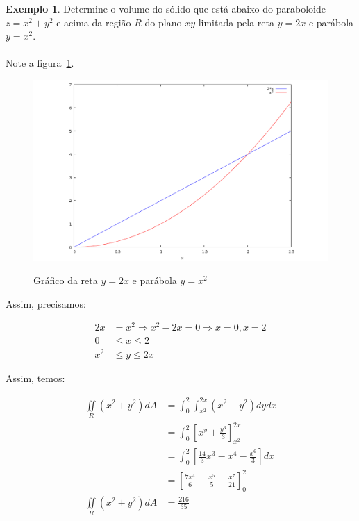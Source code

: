\documentclass{article}
\newcommand{\doubleint}[1] {\iint\limits_R #1 dA}
\theoremstyle{definition}
\newtheorem{example}{Exemplo}[section]
\begin{document}
        \begin{example}
            Determine o volume do sólido que está abaixo do paraboloide $z = x^2 + y^2$ e acima da região $R$ do plano $xy$ limitada pela reta
            $y = 2x$ e parábola $y = x^2$.

            \paragraph{}
            Note a figura~\ref{graph:reta-parabola}.
            
            \begin{figure}[h!]
                \includegraphics[width=\linewidth]{reta-parabola.png}
                \label{graph:reta-parabola}
                \caption{Gráfico da reta $y = 2x$ e parábola $y = x^2$}
            \end{figure}

            Assim, precisamos:

            \begin{align*}
                2x &= x^2 \Rightarrow x^2 - 2x = 0 \Rightarrow x = 0, x = 2\\
                0 &\leq x \leq 2\\
                x^2 &\leq y \leq 2x
            \end{align*}

            Assim, temos:

            \begin{align*}
                \doubleint{(x^2 + y^2)} &= \int_0^2 \int_{x^2}^{2x} (x^2 + y^2) dy dx\\
                &= \int_0^2 \left[ x^y + \frac{y^3}{3} \right]_{x^2}^{2x}\\
                &= \int_0^2 \left[ \frac{14}{3}x^3 - x^4 - \frac{x^6}{3} \right] dx\\
                &= \left[ \frac{7x^4}{6} - \frac{x^5}{5} - \frac{x^7}{21} \right]_0^2\\
                \doubleint{(x^2 + y^2)} &= \frac{216}{35}
            \end{align*}
        \end{example}
\end{document}
